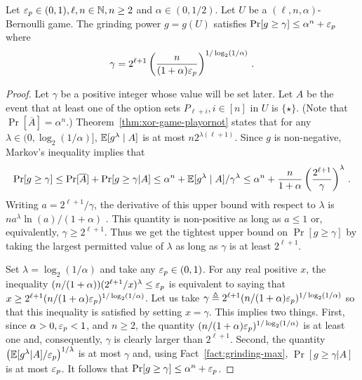     \begin{lemma}\label{lemma:xor-game-Bernoulli-gamma}
        Let $\mathsf{\varepsilon}_p \in (0,1), \ell, n \in \mathbb{N}, n \geq 2$ and 
        $\alpha \in (0, 1/2)$.
        Let $U$ be a $(\ell, n, \alpha)$-Bernoulli game. 
        The grinding power $g = g(U)$ 
        satisfies $\Pr[g \geq \gamma] \leq \alpha^n + \mathsf{\varepsilon}_p$ where 
        \begin{align}\label{eq:bernoulli-game-gamma}
            \gamma = 2^{\ell + 1} \left(
                \frac{n}{(1+\alpha)\mathsf{\varepsilon}_p}
            \right)^{1/\log_2(1/\alpha)}
            \,.
        \end{align}
    \end{lemma}
    \begin{proof}
        Let $\gamma$ be a positive integer whose value will be set later.
        Let $A$ be the event that 
        at least one of the option sets $P_{\ell + i}, i \in [n]$ in $U$ is $\{\star\}$. 
        (Note that $\Pr[\overline{A}] = \alpha^n$.)
        Theorem~\ref{thm:xor-game-playornot} states that 
        for any $\lambda \in (0, \log_2(1/\alpha)]$, 
        $\operatorname{\mathbb{E}} [g^\lambda \mid A]$ is at most $n 2^{\lambda(\ell + 1)}$. 
        Since $g$ is non-negative, 
        Markov's inequality implies that 
        $$
        \Pr[g \geq \gamma] 
        \leq \Pr[\overline{A}] + \Pr[g \geq \gamma | A]
        \leq \alpha^n  + \operatorname{\mathbb{E}}[g^\lambda \mid A]/\gamma^\lambda
        \leq \alpha^n  + \frac{n}{1+\alpha} 
            \left(\frac{2^{\ell + 1}}{\gamma}\right)^\lambda
        \,.$$ 
        Writing $a = 2^{\ell + 1}/\gamma$, 
        the derivative of this upper bound with respect to $\lambda$ is 
        $n a^\lambda \ln(a) / (1+\alpha)$ . 
        This quantity is non-positive as long as $a \leq 1$ or, equivalently, 
        $\gamma \geq 2^{\ell + 1}$. 
        Thus we get the tightest upper bound on $\Pr[g \geq \gamma]$ 
        by taking the largest permitted value of $\lambda$ 
        as long as $\gamma$ is at least $2^{\ell + 1}$. 
        
        Set $\lambda = \log_2(1/\alpha)$ and take any $\mathsf{\varepsilon}_p \in (0,1)$. 
        For any real positive $x$, 
        the inequality $(n/(1+\alpha)) (2^{\ell + 1}/x)^\lambda \leq \mathsf{\varepsilon}_p$ 
        is equivalent to saying that 
        $x \geq 2^{\ell + 1} (n/(1+\alpha)\mathsf{\varepsilon}_p)^{1/\log_2(1/\alpha)}$. 
        Let us take 
        $\gamma \triangleq 2^{\ell + 1} (n/(1+\alpha)\mathsf{\varepsilon}_p)^{1/\log_2(1/\alpha)}$ 
        so that this inequality is satisfied by setting $x = \gamma$. 
        This implies two things. 
        First, 
        since $\alpha > 0, \mathsf{\varepsilon}_p < 1$, and $n \geq 2$, 
        the quantity  $(n/(1+\alpha)\mathsf{\varepsilon}_p)^{1/\log_2(1/\alpha)}$ is at least one and, consequently, 
        $\gamma$ is clearly larger than $2^{\ell + 1}$. 
        Second, 
        the quantity 
        $\left( \operatorname{\mathbb{E}}[g^\lambda | A]/\mathsf{\varepsilon}_p \right)^{1/\lambda}$ is at most $\gamma$ 
        and, using Fact~\ref{fact:grinding-max}, 
        $\Pr[g \geq \gamma | A]$ is at most $\mathsf{\varepsilon}_p$. 
        It follows that $\Pr[g \geq \gamma] \leq \alpha^n + \mathsf{\varepsilon}_p$.
    \end{proof}



